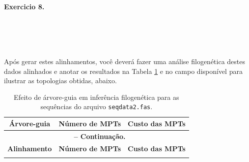 \begin{refsection}
\begin{blackBlock}{\textbf{Exercicio 8.}}
\scriptsize
{}\\
\indent{}\\
\indent{}\\
\indent{}\\
\indent{}\\
\normalsize

Após gerar estes alinhamentos, você deverá fazer uma análise filogenética destes dados alinhados e anotar os resultados na Tabela \ref{tut8:table:guide_tree} e no campo disponível para ilustrar as topologias obtidas, abaixo.

\end{blackBlock}


\pagestyle{fancy}
\begin{center}

\begin{longtable}{|c|c|c|}
\caption[Efeito de árvore-guia em inferência filogenética]{Efeito de árvore-guia em inferência filogenética para as sequências do arquivo \texttt{seqdata2.fas}.} \label{tut8:table:guide_tree} \\


\hline\hline \textbf{Árvore-guia} & \textbf{Número de MPTs}  & \textbf{Custo das MPTs}\\
\endfirsthead

\multicolumn{3}{c}{{\bfseries \tablename\ \thetable{} -- Continuação.}}\\
\hline\hline \textbf{Alinhamento} & \textbf{Número de MPTs} & \textbf{Custo das MPTs}\\
\endhead
\hline \hline
\endlastfoot


\end{longtable}
\end{center}
\end{refsection}
